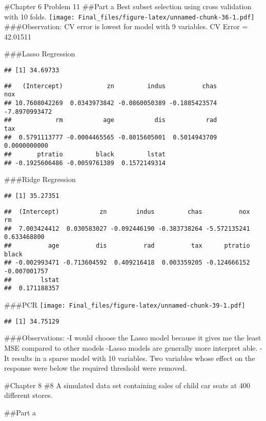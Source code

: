 \documentclass[
]{article}
\begin{document}
\#Chapter 6 Problem 11 \#\#Part a Best subset selection using cross
validation with 10 folds.
\texttt{[image: Final\_files/figure-latex/unnamed-chunk-36-1.pdf]}
\#\#\#Observation: CV error is lowest for model with 9 variables. CV
Error = 42.01511

\#\#\#Lasso Regression

\begin{verbatim}
## [1] 34.69733
\end{verbatim}

\begin{verbatim}
##   (Intercept)            zn         indus          chas           nox 
## 10.7608042269  0.0343973842 -0.0860050389 -0.1885423574 -7.8970993472 
##            rm           age           dis           rad           tax 
##  0.5791113777 -0.0004465565 -0.8015605001  0.5014943709  0.0000000000 
##       ptratio         black         lstat 
## -0.1925606486 -0.0059761389  0.1572149314
\end{verbatim}

\#\#\#Ridge Regression

\begin{verbatim}
## [1] 35.27351
\end{verbatim}

\begin{verbatim}
##  (Intercept)           zn        indus         chas          nox           rm 
##  7.003424412  0.030583027 -0.092446190 -0.383738264 -5.572135241  0.633468800 
##          age          dis          rad          tax      ptratio        black 
## -0.002993471 -0.713604592  0.409216418  0.003359205 -0.124666152 -0.007001757 
##        lstat 
##  0.171188357
\end{verbatim}

\#\#\#PCR
\texttt{[image: Final\_files/figure-latex/unnamed-chunk-39-1.pdf]}

\begin{verbatim}
## [1] 34.75129
\end{verbatim}

\#\#\#Observations: -I would choose the Lasso model because it gives me
the least MSE compared to other models -Lasso models are generally more
interpret able. -It results in a sparse model with 10 variables. Two
variables whose effect on the response were below the required threshold
were removed.

\#Chapter 8 \#8 A simulated data set containing sales of child car seats
at 400 different stores.

\#\#Part a
\end{document}
